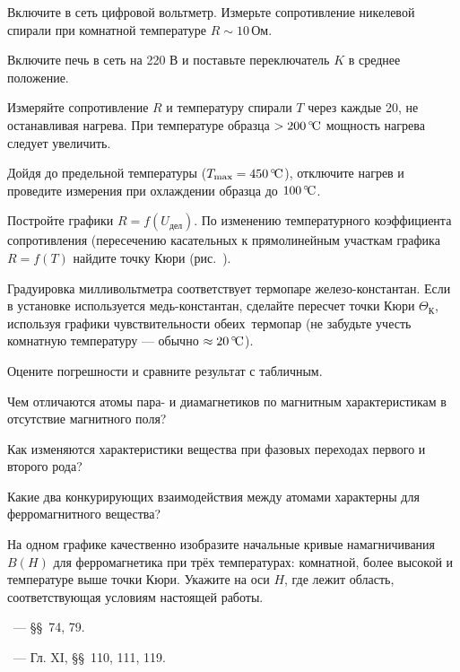 \begin{lab:task}
    
\item
  Включите в сеть цифровой вольтметр. Измерьте сопротивление никелевой спирали
при комнатной температуре $R \sim 10\,\text{Ом}$.
\item
  Включите печь в сеть на 220 В и поставьте переключатель $K$ в среднее
положение.
\item
  Измеряйте сопротивление $R$ и температуру спирали $T$ через каждые 20\oC,
  не останавливая нагрева. При температуре образца $>200\,^\circ\!\mathrm{C}$ мощность
нагрева следует увеличить.

Дойдя до предельной температуры ($T_\text{max} = 450\,^\circ\!\mathrm{C}$), отключите
нагрев и проведите измерения при охлаждении образца до $100\,^\circ\!\mathrm{C}$.


\item
  Постройте графики $R = f(U_\text{дел})$. По изменению температурного
коэффициента сопротивления (пересечению касательных к прямолинейным участкам
графика $R = f(T)$ найдите точку Кюри (рис.~).
\item
  Градуировка милливольтметра соответствует термопаре железо-кон\-стантан. Если
в установке используется медь-константан, сделайте пересчет точки Кюри
$\Theta_{К}$, используя графики чувствительности \mbox{обеих тер}\-мопар (не
забудьте учесть комнатную температуру --- обычно $\approx20\,^\circ\!\mathrm{C}$).
\item
  Оцените погрешности и сравните результат с табличным.

\end{lab:task}


\begin{lab:questions}

\item
  Чем отличаются атомы пара- и диамагнетиков по магнитным характеристикам в
отсутствие магнитного поля?
\item
  Как изменяются характеристики вещества при фазовых переходах первого и
второго рода?
\item
  Какие два конкурирующих взаимодействия между атомами характерны для
ферромагнитного вещества?
\item
  На одном графике качественно изобразите начальные кривые намагничивания
$B(H)$ для ферромагнетика при трёх температурах: комнатной, более высокой и
температуре выше точки Кюри. Укажите на оси $H$, где лежит область,
соответствующая условиям настоящей работы.

\end{lab:questions}


\begin{lab:literature}
\item \SivuhinIII~--- \S\S~74, 79.
\item \Kalashnikov~--- Гл. XI, \S\S~110, 111, 119.
\end{lab:literature}

